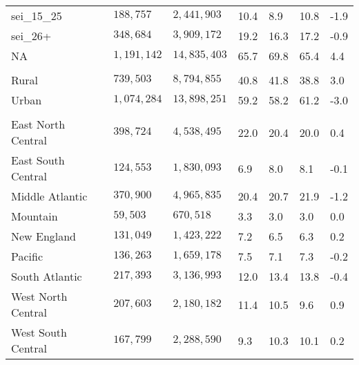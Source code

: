 \begin{longtable}{lllllll}
sei\_15\_25 & $188,757$ & $2,441,903$ & 10.4 & 8.9 & 10.8 & -1.9 \\ 
sei\_26+ & $348,684$ & $3,909,172$ & 19.2 & 16.3 & 17.2 & -0.9 \\ 
NA & $1,191,142$ & $14,835,403$ & 65.7 & 69.8 & 65.4 & 4.4 \\ 
\midrule\addlinespace[2.5pt]
\multicolumn{7}{l}{Rural} \\ 
\midrule\addlinespace[2.5pt]
Rural & $739,503$ & $8,794,855$ & 40.8 & 41.8 & 38.8 & 3.0 \\ 
Urban & $1,074,284$ & $13,898,251$ & 59.2 & 58.2 & 61.2 & -3.0 \\ 
\midrule\addlinespace[2.5pt]
\multicolumn{7}{l}{Region} \\ 
\midrule\addlinespace[2.5pt]
East North Central  & $398,724$ & $4,538,495$ & 22.0 & 20.4 & 20.0 & 0.4 \\ 
East South Central  & $124,553$ & $1,830,093$ & 6.9 & 8.0 & 8.1 & -0.1 \\ 
Middle Atlantic  & $370,900$ & $4,965,835$ & 20.4 & 20.7 & 21.9 & -1.2 \\ 
Mountain  & $59,503$ & $670,518$ & 3.3 & 3.0 & 3.0 & 0.0 \\ 
New England  & $131,049$ & $1,423,222$ & 7.2 & 6.5 & 6.3 & 0.2 \\ 
Pacific  & $136,263$ & $1,659,178$ & 7.5 & 7.1 & 7.3 & -0.2 \\ 
South Atlantic  & $217,393$ & $3,136,993$ & 12.0 & 13.4 & 13.8 & -0.4 \\ 
West North Central  & $207,603$ & $2,180,182$ & 11.4 & 10.5 & 9.6 & 0.9 \\ 
West South Central  & $167,799$ & $2,288,590$ & 9.3 & 10.3 & 10.1 & 0.2 \\ 
\bottomrule
\end{longtable}

